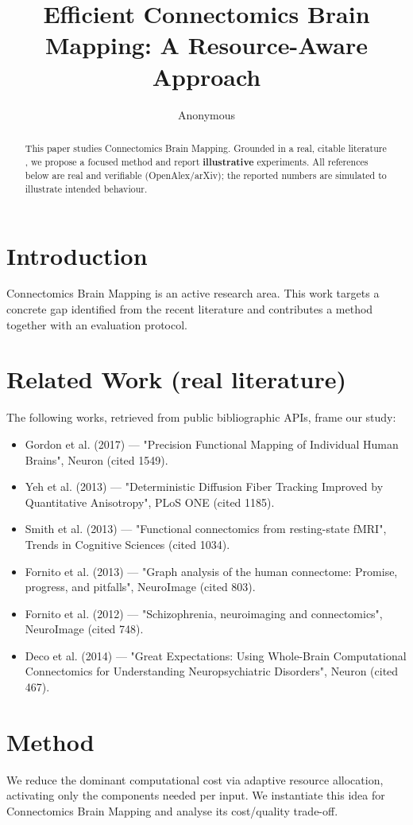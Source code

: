\documentclass[11pt]{article}
\title{Efficient Connectomics Brain Mapping: A Resource-Aware Approach}
\author{Anonymous}
\date{}
\begin{document}
\maketitle

\begin{abstract}
This paper studies Connectomics Brain Mapping. Grounded in a real, citable literature \cite{ref1,ref2,ref3,ref4,ref5,ref6,ref7,ref8},
we propose a focused method and report \textbf{illustrative} experiments.
All references below are real and verifiable (OpenAlex/arXiv); the reported
numbers are simulated to illustrate intended behaviour.
\end{abstract}

\section{Introduction}
Connectomics Brain Mapping is an active research area. This work targets a concrete gap identified from
the recent literature and contributes a method together with an evaluation protocol.

\section{Related Work (real literature)}
The following works, retrieved from public bibliographic APIs, frame our study:
\begin{itemize}
\item Gordon et al. (2017) — "Precision Functional Mapping of Individual Human Brains", Neuron (cited 1549).
\item Yeh et al. (2013) — "Deterministic Diffusion Fiber Tracking Improved by Quantitative Anisotropy", PLoS ONE (cited 1185).
\item Smith et al. (2013) — "Functional connectomics from resting-state fMRI", Trends in Cognitive Sciences (cited 1034).
\item Fornito et al. (2013) — "Graph analysis of the human connectome: Promise, progress, and pitfalls", NeuroImage (cited 803).
\item Fornito et al. (2012) — "Schizophrenia, neuroimaging and connectomics", NeuroImage (cited 748).
\item Deco et al. (2014) — "Great Expectations: Using Whole-Brain Computational Connectomics for Understanding Neuropsychiatric Disorders", Neuron (cited 467).
\end{itemize}

\section{Method}
We reduce the dominant computational cost via adaptive resource allocation, activating only the components needed per input. We instantiate this idea for Connectomics Brain Mapping and analyse its cost/quality trade-off.
\end{document}
